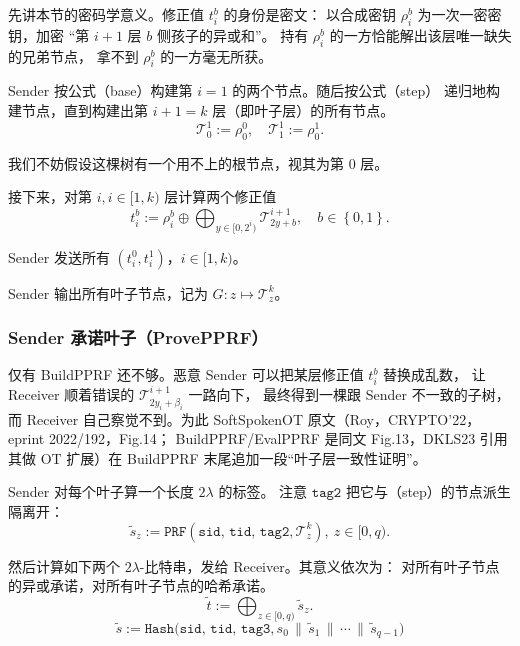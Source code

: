 先讲本节的密码学意义。修正值 $t_i^b$ 的身份是密文：
以合成密钥 $\rho_i^b$ 为一次一密密钥，加密
“第 $i+1$ 层 $b$ 侧孩子的异或和”。
持有 $\rho_i^b$ 的一方恰能解出该层唯一缺失的兄弟节点，
拿不到 $\rho_i^b$ 的一方毫无所获。

Sender 按公式（base）构建第 $i=1$ 的两个节点。随后按公式（step）
递归地构建节点，直到构建出第 $i+1=k$ 层（即叶子层）的所有节点。
\begin{equation}\label{eq:04-pprf:base}
\mathcal{T}^1_0 := \rho_0^0, \quad \mathcal{T}^1_1 := \rho_0^1. \tag{base}
\end{equation}

我们不妨假设这棵树有一个用不上的根节点，视其为第 0 层。

接下来，对第 $i, i\in[1, k)$ 层计算两个修正值
\begin{equation}\label{eq:04-pprf:corr}
t_i^b :=
\rho_i^b \oplus \bigoplus_{y \in [0, 2^i)} \mathcal{T}^{i+1}_{2y + b},
\quad
b \in \left\{0,1\right\}. \tag{corr}
\end{equation}

Sender 发送所有 $(t_i^0, t_i^1)$，$i\in[1, k)$。

Sender 输出所有叶子节点，记为 $G: z \mapsto \mathcal{T}^k_z$。

\subsubsection{Sender 承诺叶子（ProvePPRF）}

仅有 BuildPPRF 还不够。恶意 Sender 可以把某层修正值 $t_i^b$ 替换成乱数，
让 Receiver 顺着错误的 $\mathcal{T}^{i+1}_{2y_i + \beta_i}$ 一路向下，
最终得到一棵跟 Sender 不一致的子树，而 Receiver 自己察觉不到。为此
SoftSpokenOT 原文（Roy，CRYPTO'22，eprint 2022/192，Fig.14；
BuildPPRF/EvalPPRF 是同文 Fig.13，DKLS23 引用其做 OT 扩展）在 BuildPPRF
末尾追加一段“叶子层一致性证明”。

Sender 对每个叶子算一个长度 $2\lambda$ 的标签。
注意 $\mathtt{tag2}$ 把它与（step）的节点派生隔离开：
\begin{equation}\label{eq:04-pprf:sz}
\tilde s_z := \mathtt{PRF}(\mathtt{sid},\, \mathtt{tid},\, \mathtt{tag2},
\mathcal{T}^k_z), ~ z \in [0, q). \tag{sz}
\end{equation}

然后计算如下两个 $2\lambda$-比特串，发给 Receiver。其意义依次为：
对所有叶子节点的异或承诺，对所有叶子节点的哈希承诺。
\begin{equation}\label{eq:04-pprf:com-x}
\tilde t := \bigoplus_{z \in [0, q)} \tilde s_z. \tag{com-x}
\end{equation}
\begin{equation}\label{eq:04-pprf:com-h}
\tilde s := \mathtt{Hash}\bigl(\mathtt{sid},\, \mathtt{tid},\, \mathtt{tag3},s_0 \,\|\, \tilde s_1 \,\|\, \cdots \,\|\, \tilde s_{q-1}\bigr) \tag{com-h}
\end{equation}


